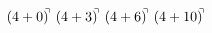 \documentclass[preview]{standalone}
\begin{document}
\begin{align*}
(4+0)^{\hspace{-0.1cm}\urcorner} \ (4+3)^{\hspace{-0.1cm}\urcorner} \ (4+6)^{\hspace{-0.1cm}\urcorner} \ (4+10)^{\hspace{-0.1cm}\urcorner}
\end{align*}
\end{document}
